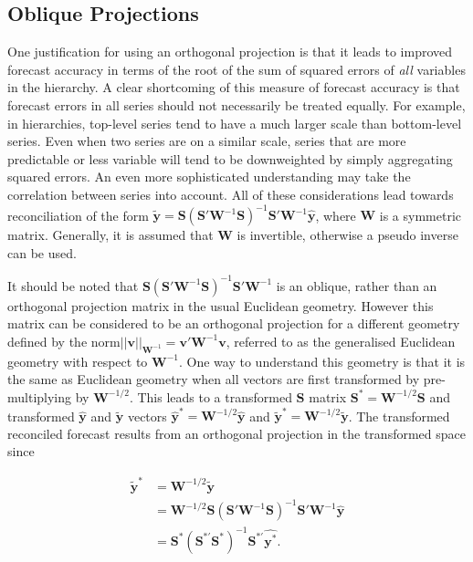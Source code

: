 \documentclass[12pt]{article}
\theoremstyle{definition}
\begin{document}
	\subsection{Oblique Projections}\label{sec:oblique}
	
	One justification for using an orthogonal projection is that it leads to improved forecast accuracy in terms of the root of the sum of squared errors of {\em all} variables in the hierarchy.  A clear shortcoming of this measure of forecast accuracy is that forecast errors in all series should not necessarily be treated equally.  For example, in hierarchies, top-level series tend to have a much larger scale than bottom-level series.  Even when two series are on a similar scale, series that are more predictable or less variable will tend to be downweighted by simply aggregating squared errors.  An even more sophisticated understanding may take the correlation between series into account.  All of these considerations lead towards reconciliation of the form $\tilde{\bm{y}}=\bm{S}\left(\bm{S}'\bm{W}^{-1}\bm{S}\right)^{-1}\bm{S}'\bm{W}^{-1}\hat{\bm{y}}$, where $\bm{W}$ is a symmetric matrix.  Generally, it is assumed that $\bm{W}$ is invertible, otherwise a pseudo inverse can be used.
	
	It should be noted that  $\bm{S}\left(\bm{S}'\bm{W}^{-1}\bm{S}\right)^{-1}\bm{S}'\bm{W}^{-1}$ is an oblique, rather than an orthogonal projection matrix in the usual Euclidean geometry.  However this matrix can be considered to be an orthogonal projection for a different geometry defined by the norm\break $||\bm{v}||_{{\bm W}^{-1}}=\bm{v}'\bm{W}^{-1}\bm{v}$, referred to as the generalised Euclidean geometry with respect to $\bm{W}^{-1}$.  One way to understand this geometry is that it is the same as Euclidean geometry when all vectors are first transformed by pre-multiplying by $\bm{W}^{-1/2}$.  This leads to a transformed $\bm{S}$ matrix $\bm{S}^*=\bm{W}^{-1/2}\bm{S}$ and transformed $\hat{\bm{y}}$ and $\tilde{\bm{y}}$ vectors $\hat{\bm{y}}^*=\bm{W}^{-1/2}\hat{\bm{y}}$ and $\tilde{\bm{y}}^*=\bm{W}^{-1/2}\tilde{\bm{y}}$.  The transformed reconciled forecast results from an orthogonal projection in the transformed space since
	
	\begin{align*}
	\tilde{\bm{y}}^*&=\bm{W}^{-1/2}\tilde{\bm{y}}\\&=\bm{W}^{-1/2}\bm{S}\left(\bm{S}'\bm{W}^{-1}\bm{S}\right)^{-1}\bm{S}'\bm{W}^{-1}\hat{\bm{y}}
	\\&=\bm{S}^*\left(\bm{S}^{*'}\bm{S}^*\right)^{-1}\bm{S}^{*'}\hat{\bm{y}^*}.
	\end{align*}
	
\end{document}
